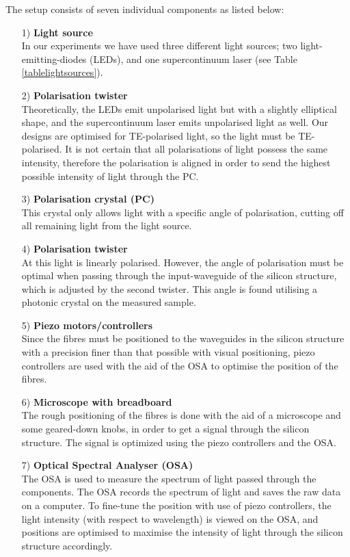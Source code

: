The setup consists of seven individual components as listed below: 
\begin{itemize}

    \item[1)] \textbf{Light source}\\
In our experiments we have used three different light sources; two light-emitting-diodes (LEDs), and one supercontinuum laser (see Table \ref{tablelightsources}). 

    \item[2)] \textbf{Polarisation twister}\\
Theoretically, the LEDs emit unpolarised light but with a slightly elliptical shape, and the supercontinuum laser emits unpolarised light as well. Our designs are optimised for TE-polarised light, so the light must be TE-polarised. It is not certain that all polarisations of light possess the same intensity, therefore the polarisation is aligned in order to send the highest possible intensity of light through the PC. 

    \item[3)] \textbf{Polarisation crystal (PC)}\\
This crystal only allows light with a specific angle of polarisation, cutting off all remaining light from the light source. 

    \item[4)] \textbf{Polarisation twister}\\
At this light is linearly polarised. However, the angle of polarisation must be optimal when passing through the input-waveguide of the silicon structure, which is adjusted by the second twister. This angle is found utilising a photonic crystal on the measured sample. 

    \item[5)] \textbf{Piezo motors/controllers}\\
Since the fibres must be positioned to the waveguides in the silicon structure with a precision finer than that possible with visual positioning, piezo controllers are used with the aid of the OSA to optimise the position of the fibres. 

    \item[6)] \textbf{Microscope with breadboard}\\ 
The rough positioning of the fibres is done with the aid of a microscope and some geared-down knobs, in order to get a signal through the silicon structure. The signal is optimized using the piezo controllers and the OSA. 

    \item[7)] \textbf{Optical Spectral Analyser (OSA)}\\
The OSA is used to measure the spectrum of light passed through the components. The OSA records the spectrum of light and saves the raw data on a computer. To fine-tune the position with use of piezo controllers, the light intensity (with respect to wavelength) is viewed on the OSA, and positions are optimised to maximise the intensity of light through the silicon structure accordingly. 

\end{itemize}

